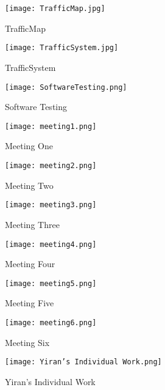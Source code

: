 \documentclass[12pt]{amsart}
\begin{document}
\clearpage

\begin{figure}[htbp]
\texttt{[image: TrafficMap.jpg]}
\caption{TrafficMap}
\end{figure}

\clearpage

\begin{figure}[htbp]
\texttt{[image: TrafficSystem.jpg]}
\caption{TrafficSystem}
\end{figure}

\clearpage

\begin{figure}
\texttt{[image: SoftwareTesting.png]}
\caption{Software Testing}
\end{figure}

\clearpage

\begin{figure}
\texttt{[image: meeting1.png]}
\caption{Meeting One}
\end{figure}

\clearpage

\begin{figure}[htbp]
\texttt{[image: meeting2.png]}
\caption{Meeting Two}
\end{figure}

\clearpage

\begin{figure}[htbp]
\texttt{[image: meeting3.png]}
\caption{Meeting Three}
\end{figure}

\clearpage

\begin{figure}[htbp]
\texttt{[image: meeting4.png]}
\caption{Meeting Four}
\end{figure}

\clearpage

\begin{figure}[htbp]
\texttt{[image: meeting5.png]}
\caption{Meeting Five}
\end{figure}

\clearpage

\begin{figure}[htbp]
\texttt{[image: meeting6.png]}
\caption{Meeting Six}
\end{figure}

\clearpage

\begin{figure}[htbp]
\texttt{[image: Yiran's Individual Work.png]}
\caption{Yiran's Individual Work}
\end{figure}
\end{document}
